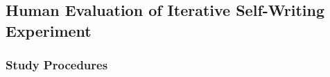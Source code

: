 

\subsection{Human Evaluation of Iterative Self-Writing Experiment}\label{sec:appendix:human-eval}

\subsubsection{Study Procedures}

